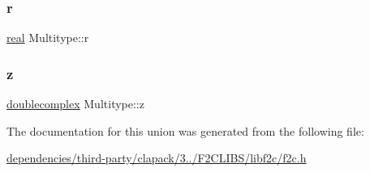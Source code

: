 \mbox{\label{union_multitype_ab4eba1c6e83e32ee5b08b7550b46907c}} 
\subsubsection{\texorpdfstring{r}{r}}
{\footnotesize\ttfamily \hyperlink{dependencies_2third-party_2clapack_23_82_81_2_f2_c_l_i_b_s_2libf2c_2f2c_8h_a031f8951175b43076c2084a6c2173410}{real} Multitype\+::r}

\mbox{\label{union_multitype_aa031f83e1db7e8f751458cebe7b9d897}} 
\subsubsection{\texorpdfstring{z}{z}}
{\footnotesize\ttfamily \hyperlink{structdoublecomplex}{doublecomplex} Multitype\+::z}



The documentation for this union was generated from the following file\+:\begin{DoxyCompactItemize}
\item 
\hyperlink{dependencies_2third-party_2clapack_23_82_81_2_f2_c_l_i_b_s_2libf2c_2f2c_8h}{dependencies/third-\/party/clapack/3../\+F2\+C\+L\+I\+B\+S/libf2c/f2c.\+h}\end{DoxyCompactItemize}
